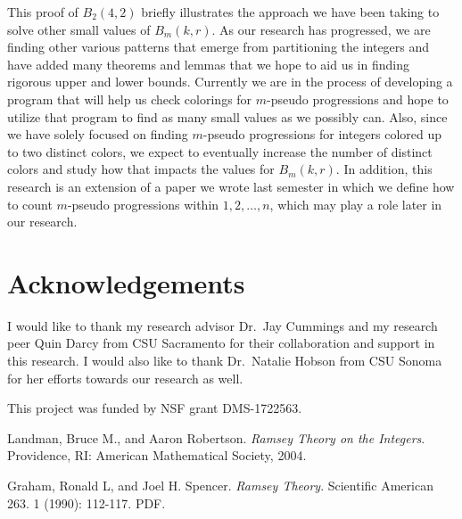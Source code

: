 \documentclass[ fontsize=10pt,twoside]{scrartcl}
\begin{document}
This proof of $B_2(4,2)$ briefly illustrates the approach we have been taking to solve other small values of $B_m(k,r)$. As our research has progressed, we are finding other various patterns that emerge from partitioning the integers and have added many theorems and lemmas that we hope to aid us in finding rigorous upper and lower bounds. Currently we are in the process of developing a program that will help us check colorings for $m$-pseudo progressions and hope to utilize that program to find as many small values as we possibly can. Also, since we have solely focused on finding $m$-pseudo progressions for integers colored up to two distinct colors, we expect to eventually increase the number of distinct colors and study how that impacts the values for $B_m(k,r)$. In addition, this research is an extension of a paper we wrote last semester in which we define how to count $m$-pseudo progressions within $1,2,\ldots,n$, which may play a role later in our research.

\section{Acknowledgements}
I would like to thank my research advisor Dr.\ Jay Cummings and my research peer Quin Darcy from CSU Sacramento for their collaboration and support in this research. I would also like to thank Dr.\ Natalie Hobson from CSU Sonoma for her efforts towards our research as well.

This project was funded by NSF grant DMS-1722563.


\begin{thebibliography}{}
 Landman, Bruce M., and Aaron Robertson. \emph{Ramsey Theory on the Integers}. Providence, RI: American Mathematical Society, 2004.

 Graham, Ronald L, and Joel H. Spencer. \emph{Ramsey Theory}. Scientific American 263. 1 (1990): 112-117. PDF.

\end{thebibliography}
\end{document}
